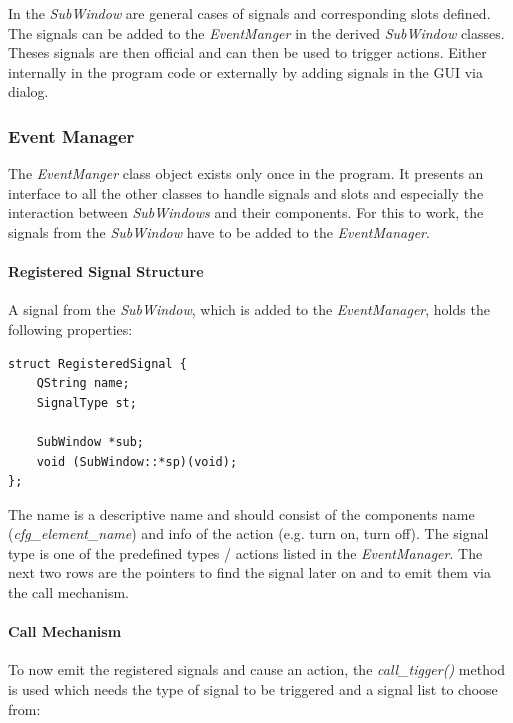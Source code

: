 \documentclass[10pt,a4paper]{article}
\begin{document}
\bigbreak

In the \textit{SubWindow} are general cases of signals and corresponding slots defined. The signals can be added to the \textit{EventManger} in the derived \textit{SubWindow} classes. Theses signals are then official and can then be used to trigger actions. Either internally in the program code or externally by adding signals in the GUI via dialog. 

	\subsubsection{Event Manager}
	
	The \textit{EventManger} class object exists only once in the program. It presents an interface to all the other classes to handle signals and slots and especially the interaction between \textit{SubWindows} and their components. For this to work, the signals from the \textit{SubWindow} have to be added to the \textit{EventManager}.
	
		\paragraph{Registered Signal Structure}

		A signal from the \textit{SubWindow}, which is added to the \textit{EventManager}, holds the following properties:
		
\begin{lstlisting}[caption=EventManager.h]
struct RegisteredSignal {
	QString name;
	SignalType st;

	SubWindow *sub;
	void (SubWindow::*sp)(void);
};
\end{lstlisting}

			The name is a descriptive name and should consist of the components name (\textit{cfg\_element\_name}) and info of the action (e.g. turn on, turn off). The signal type is one of the predefined types / actions listed in the \textit{EventManager}. The next two rows are the pointers to find the signal later on and to emit them via the call mechanism.

		\paragraph{Call Mechanism}
		
		To now emit the registered signals and cause an action, the \textit{call\_tigger()} method is used which needs the type of signal to be triggered and a signal list to choose from:
		
\end{document}
